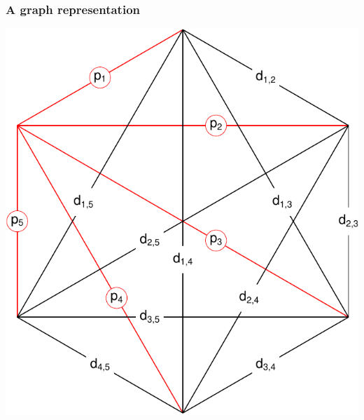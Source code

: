 \documentclass[20pt]{beamer}
\begin{document}
\begin{frame}
\frametitle{A graph representation}
\centering
\includegraphics[scale=1.1]{Figures/edgep5.pdf}\\
\end{frame}
\end{document}
